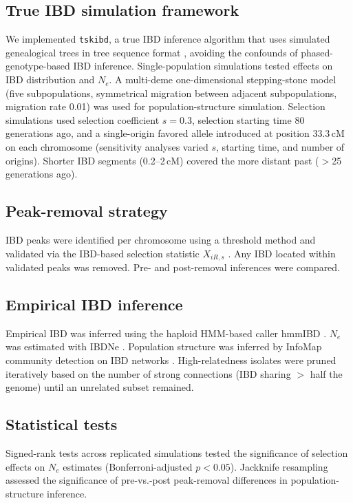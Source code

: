 \documentclass[11pt]{article}
\begin{document}
\subsection{True IBD simulation framework}
We implemented \texttt{tskibd}, a true IBD inference algorithm that uses simulated genealogical trees in tree sequence format \citep{r52,r53}, avoiding the confounds of phased-genotype-based IBD inference. Single-population simulations tested effects on IBD distribution and $N_e$. A multi-deme one-dimensional stepping-stone model (five subpopulations, symmetrical migration between adjacent subpopulations, migration rate 0.01) was used for population-structure simulation. Selection simulations used selection coefficient $s=0.3$, selection starting time 80 generations ago, and a single-origin favored allele introduced at position 33.3\,cM on each chromosome (sensitivity analyses varied $s$, starting time, and number of origins). Shorter IBD segments (0.2--2\,cM) covered the more distant past ($>$25 generations ago).

\subsection{Peak-removal strategy}
IBD peaks were identified per chromosome using a threshold method and validated via the IBD-based selection statistic $X_{iR,s}$ \citep{r9}. Any IBD located within validated peaks was removed. Pre- and post-removal inferences were compared.

\subsection{Empirical IBD inference}
Empirical IBD was inferred using the haploid HMM-based caller hmmIBD \citep{r59}. $N_e$ was estimated with IBDNe \citep{r12}. Population structure was inferred by InfoMap community detection on IBD networks \citep{r57,r58}. High-relatedness isolates were pruned iteratively based on the number of strong connections (IBD sharing $>$ half the genome) until an unrelated subset remained.

\subsection{Statistical tests}
Signed-rank tests across replicated simulations tested the significance of selection effects on $N_e$ estimates (Bonferroni-adjusted $p<0.05$). Jackknife resampling assessed the significance of pre-vs.-post peak-removal differences in population-structure inference.
\end{document}

